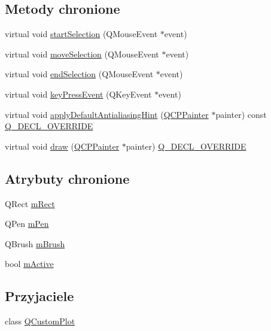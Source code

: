 \subsection*{Metody chronione}
\begin{DoxyCompactItemize}
\item 
virtual void \hyperlink{class_q_c_p_selection_rect_a271f24cfca8bc50a0e2b4310ff90e227}{start\+Selection} (Q\+Mouse\+Event $\ast$event)
\item 
virtual void \hyperlink{class_q_c_p_selection_rect_a95c3f1700be2a6d7bba0fe56ece5fbb1}{move\+Selection} (Q\+Mouse\+Event $\ast$event)
\item 
virtual void \hyperlink{class_q_c_p_selection_rect_a625bcffd73987f6de6c6559aaf29ab9d}{end\+Selection} (Q\+Mouse\+Event $\ast$event)
\item 
virtual void \hyperlink{class_q_c_p_selection_rect_a1affe764316d6122a26fdb2e9583feb1}{key\+Press\+Event} (Q\+Key\+Event $\ast$event)
\item 
virtual void \hyperlink{class_q_c_p_selection_rect_aa854697618e16037ba9c73056abfb9bf}{apply\+Default\+Antialiasing\+Hint} (\hyperlink{class_q_c_p_painter}{Q\+C\+P\+Painter} $\ast$painter) const \hyperlink{qcustomplot_8hh_a42cc5eaeb25b85f8b52d2a4b94c56f55}{Q\+\_\+\+D\+E\+C\+L\+\_\+\+O\+V\+E\+R\+R\+I\+DE}
\item 
virtual void \hyperlink{class_q_c_p_selection_rect_ab0e50ae796508bdcd97ab8c335c593bf}{draw} (\hyperlink{class_q_c_p_painter}{Q\+C\+P\+Painter} $\ast$painter) \hyperlink{qcustomplot_8hh_a42cc5eaeb25b85f8b52d2a4b94c56f55}{Q\+\_\+\+D\+E\+C\+L\+\_\+\+O\+V\+E\+R\+R\+I\+DE}
\end{DoxyCompactItemize}
\subsection*{Atrybuty chronione}
\begin{DoxyCompactItemize}
\item 
Q\+Rect \hyperlink{class_q_c_p_selection_rect_a45a2600ef19c8f7b5ec6134beab036cf}{m\+Rect}
\item 
Q\+Pen \hyperlink{class_q_c_p_selection_rect_ae255dec12cd531071115bd667f0fd815}{m\+Pen}
\item 
Q\+Brush \hyperlink{class_q_c_p_selection_rect_a1bda3f02c2e4da58c856d19695028cbe}{m\+Brush}
\item 
bool \hyperlink{class_q_c_p_selection_rect_a1c167356b0bc59e62691bff8c90f5851}{m\+Active}
\end{DoxyCompactItemize}
\subsection*{Przyjaciele}
\begin{DoxyCompactItemize}
\item 
class \hyperlink{class_q_c_p_selection_rect_a1cdf9df76adcfae45261690aa0ca2198}{Q\+Custom\+Plot}
\end{DoxyCompactItemize}


